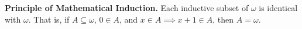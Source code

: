 \textbf{Principle of Mathematical Induction.} Each inductive subset of $\omega$ is identical with $\omega$. That is, if $A \subseteq \omega$, $0 \in A$, and $x \in A \implies x+1 \in A$, then $A = \omega$.

